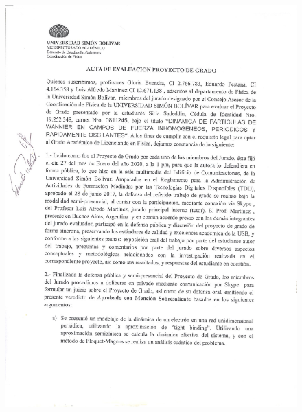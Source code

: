 \begin{figure}
    \centering
    \includegraphics[width=1\columnwidth]{imagenes/ActadefensaSiria1.pdf}
\end{figure}

